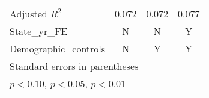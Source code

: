 \begin{table}[htbp]
\begin{tabular}{l*{3}{c}}
Adjusted \(R^{2}\)  &       0.072         &       0.072         &       0.077         \\
State\_yr\_FE         &           N         &           N         &           Y         \\
Demographic\_controls&           N         &           Y         &           Y         \\
\hline\hline
\multicolumn{4}{l}{\footnotesize Standard errors in parentheses}\\
\multicolumn{4}{l}{\footnotesize \sym{*} \(p<0.10\), \sym{**} \(p<0.05\), \sym{***} \(p<0.01\)}\\
\end{tabular}
\end{table}
